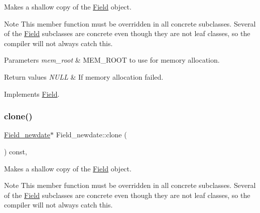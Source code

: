 Makes a shallow copy of the \mbox{\hyperlink{classField}{Field}} object.

\begin{DoxyNote}{Note}
This member function must be overridden in all concrete subclasses. Several of the \mbox{\hyperlink{classField}{Field}} subclasses are concrete even though they are not leaf classes, so the compiler will not always catch this.
\end{DoxyNote}

\begin{DoxyParams}{Parameters}
{\em mem\+\_\+root} & M\+E\+M\+\_\+\+R\+O\+OT to use for memory allocation. \\
\hline
\end{DoxyParams}

\begin{DoxyRetVals}{Return values}
{\em N\+U\+LL} & If memory allocation failed. \\
\hline
\end{DoxyRetVals}


Implements \mbox{\hyperlink{classField_a64979bcb9345803b031fff76a0c3d9fe}{Field}}.

\mbox{\label{classField__newdate_a65ff3f5d3a9c0a8022159d88ccc911a4}} 
\subsubsection{\texorpdfstring{clone()}{clone()}\hspace{0.1cm}{\footnotesize\ttfamily [2/2]}}
{\footnotesize\ttfamily \mbox{\hyperlink{classField__newdate}{Field\+\_\+newdate}}$\ast$ Field\+\_\+newdate\+::clone (\begin{DoxyParamCaption}{ }\end{DoxyParamCaption}) const\hspace{0.3cm}{\ttfamily [inline]}, {\ttfamily [virtual]}}

Makes a shallow copy of the \mbox{\hyperlink{classField}{Field}} object.

\begin{DoxyNote}{Note}
This member function must be overridden in all concrete subclasses. Several of the \mbox{\hyperlink{classField}{Field}} subclasses are concrete even though they are not leaf classes, so the compiler will not always catch this.
\end{DoxyNote}

